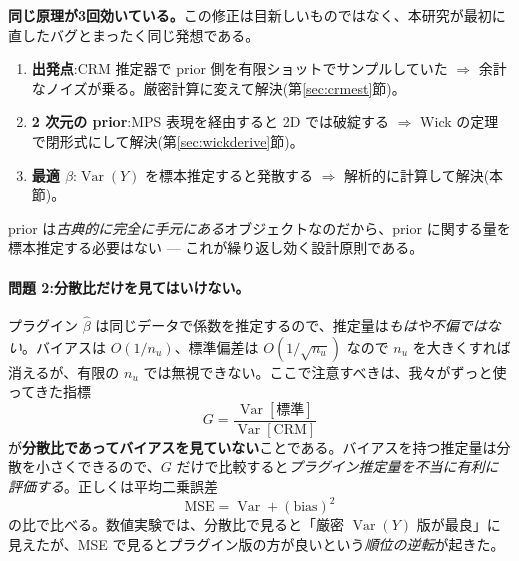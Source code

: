 \documentclass[11pt,a4paper]{ltjsarticle}
\newcommand{\Var}{\operatorname{Var}}
\begin{document}
\begin{keybox}
\textbf{同じ原理が3回効いている。}この修正は目新しいものではなく、本研究が最初に直したバグとまったく同じ発想である。
\begin{enumerate}
  \item \textbf{出発点}:CRM 推定器で prior 側を有限ショットでサンプルしていた $\Rightarrow$ 余計なノイズが乗る。厳密計算に変えて解決(第\ref{sec:crmest}節)。
  \item \textbf{2 次元の prior}:MPS 表現を経由すると 2D では破綻する $\Rightarrow$ Wick の定理で閉形式にして解決(第\ref{sec:wickderive}節)。
  \item \textbf{最適 $\beta$}:$\Var(Y)$ を標本推定すると発散する $\Rightarrow$ 解析的に計算して解決(本節)。
\end{enumerate}
prior は\emph{古典的に完全に手元にある}オブジェクトなのだから、prior に関する量を標本推定する必要はない --- これが繰り返し効く設計原則である。
\end{keybox}

\paragraph{問題 2:分散比だけを見てはいけない。}
プラグイン $\hat\beta$ は同じデータで係数を推定するので、推定量は\emph{もはや不偏ではない}。バイアスは $O(1/n_u)$、標準偏差は $O(1/\sqrt{n_u})$ なので $n_u$ を大きくすれば消えるが、有限の $n_u$ では無視できない。ここで注意すべきは、我々がずっと使ってきた指標
\begin{equation}
  G=\frac{\Var[\text{標準}]}{\Var[\text{CRM}]}
\end{equation}
が\textbf{分散比であってバイアスを見ていない}ことである。バイアスを持つ推定量は分散を小さくできるので、$G$ だけで比較すると\emph{プラグイン推定量を不当に有利に評価する}。正しくは平均二乗誤差
\begin{equation}
  \mathrm{MSE} = \Var + (\text{bias})^2
\end{equation}
の比で比べる。数値実験では、分散比で見ると「厳密 $\Var(Y)$ 版が最良」に見えたが、MSE で見るとプラグイン版の方が良いという\emph{順位の逆転}が起きた。
\end{document}
